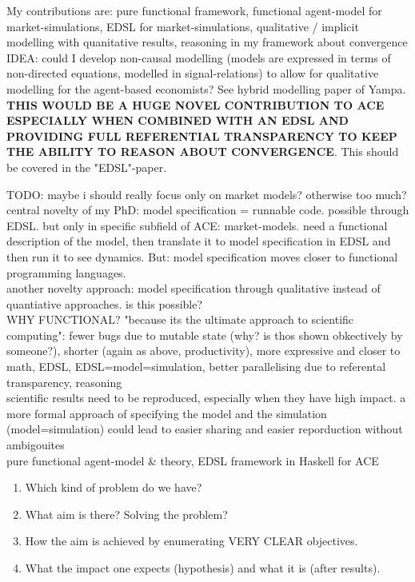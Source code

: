 My contributions are: pure functional framework, functional agent-model for market-simulations, EDSL for market-simulations, qualitative / implicit modelling with quanitative results, reasoning in my framework about convergence \\

IDEA: could I develop non-causal modelling (models are expressed in terms of non-directed equations, modelled in signal-relations) to allow for qualitative modelling for the agent-based economists? See hybrid modelling paper of Yampa. \textbf{THIS WOULD BE A HUGE NOVEL CONTRIBUTION TO ACE ESPECIALLY WHEN COMBINED WITH AN EDSL AND PROVIDING FULL REFERENTIAL TRANSPARENCY TO KEEP THE ABILITY TO REASON ABOUT CONVERGENCE}. This should be covered in the "EDSL"-paper.

TODO: maybe i should really focus only on market models? otherwise too much? \\

central novelty of my PhD: model specification = runnable code. possible through EDSL. but only in specific subfield of ACE: market-models. need a functional description of the model, then translate it to model specification in EDSL and then run it to see dynamics. But: model specification moves closer to functional programming languages. \\

another novelty approach: model specification through qualitative instead of quantiative approaches. is this possible? \\

WHY FUNCTIONAL? "because its the ultimate approach to scientific computing": fewer bugs due to mutable state (why? is thos shown obkectively by someone?), shorter (again as above, productivity), more expressive and closer to math, EDSL, EDSL=model=simulation, better parallelising due to referental transparency, reasoning \\

scientific results need to be reproduced, especially when they have high impact. a more formal approach of specifying the model and the simulation (model=simulation) could lead to easier sharing and easier reporduction without ambigouites \\

pure functional agent-model \& theory, EDSL framework in Haskell for ACE

\begin{enumerate}
\item Which kind of problem do we have?
\item What aim is there? Solving the problem? 
\item How the aim is achieved by enumerating VERY CLEAR objectives.
\item What the impact one expects (hypothesis) and what it is (after results).
\end{enumerate}


